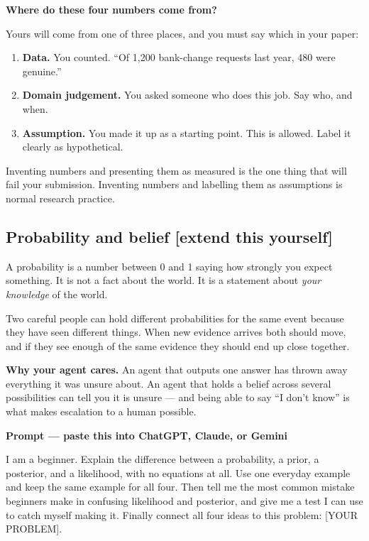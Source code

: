 \documentclass[11pt,a4paper]{article}
\newcommand{\boxtitle}[1]{{\bfseries #1}\par\vspace{2pt}}
\newcommand{\taught}{\hfill{\footnotesize\sffamily\color{sbaccent}[extend this yourself]}}
\newenvironment{learnprompt}
  {\begin{sbbox}\boxtitle{Prompt --- paste this into ChatGPT, Claude, or Gemini}%
   \ttfamily\small\raggedright}
  {\end{sbbox}}
\begin{document}
\begin{sbbox}
\boxtitle{Where do these four numbers come from?}
Yours will come from one of three places, and you must say which in your paper:
\begin{enumerate}
  \item \textbf{Data.} You counted. ``Of 1{,}200 bank-change requests last year, 480 were genuine.''
  \item \textbf{Domain judgement.} You asked someone who does this job. Say who, and when.
  \item \textbf{Assumption.} You made it up as a starting point. This is allowed. Label it
        clearly as hypothetical.
\end{enumerate}
Inventing numbers and presenting them as measured is the one thing that will fail your
submission. Inventing numbers and labelling them as assumptions is normal research practice.
\end{sbbox}

\subsection{Probability and belief \taught}

A probability is a number between 0 and 1 saying how strongly you expect something. It is not a
fact about the world. It is a statement about \emph{your knowledge} of the world.

Two careful people can hold different probabilities for the same event because they have seen
different things. When new evidence arrives both should move, and if they see enough of the same
evidence they should end up close together.

\textbf{Why your agent cares.} An agent that outputs one answer has thrown away everything it
was unsure about. An agent that holds a belief across several possibilities can tell you it is
unsure --- and being able to say ``I don't know'' is what makes escalation to a human possible.

\begin{learnprompt}
I am a beginner. Explain the difference between a probability, a prior, a posterior, and a
likelihood, with no equations at all. Use one everyday example and keep the same example for
all four. Then tell me the most common mistake beginners make in confusing likelihood and
posterior, and give me a test I can use to catch myself making it. Finally connect all four
ideas to this problem: [YOUR PROBLEM].
\end{learnprompt}
\end{document}
